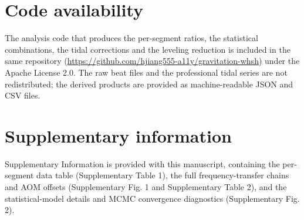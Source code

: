 \documentclass[11pt,a4paper]{article}
\begin{document}
\section*{Code availability}
The analysis code that produces the per-segment ratios, the statistical
combinations, the tidal corrections and the leveling reduction is included
in the same repository
(\url{https://github.com/hjiang555-a11y/gravitation-whsh}) under the Apache
License 2.0. The raw beat files and the professional tidal series are not
redistributed; the derived products are provided as machine-readable JSON
and CSV files.


\section*{Supplementary information}
Supplementary Information is provided with this manuscript, containing the
per-segment data table (Supplementary Table 1), the full frequency-transfer
chains and AOM offsets (Supplementary Fig. 1 and Supplementary Table 2),
and the statistical-model details and MCMC convergence diagnostics
(Supplementary Fig. 2).




\end{document}
